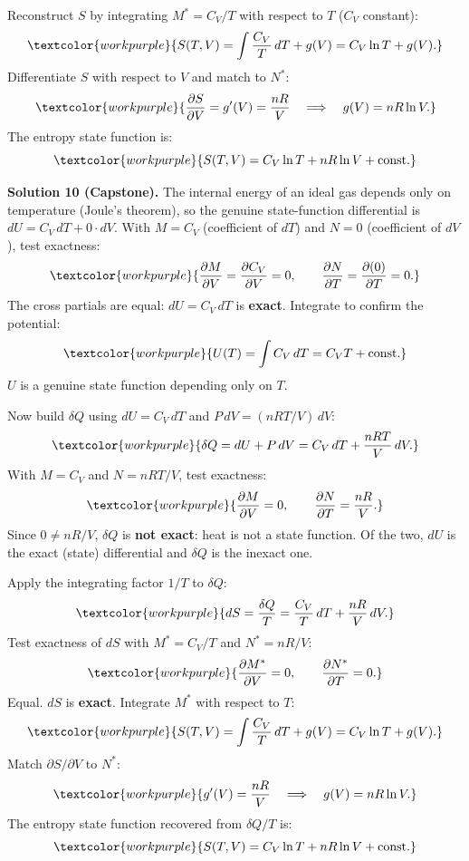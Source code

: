Reconstruct $S$ by integrating $M^* = C_V/T$ with respect to $T$
($C_V$ constant):
\[
  \textcolor{workpurple}{S(T,V)
  = \int \frac{C_V}{T}\,dT + g(V)
  = C_V\ln T + g(V).}
\]
Differentiate $S$ with respect to $V$ and match to $N^*$:
\[
  \textcolor{workpurple}{\frac{\partial S}{\partial V}
  = g'(V)
  = \frac{nR}{V}
  \quad\Longrightarrow\quad
  g(V) = nR\ln V.}
\]
The entropy state function is:
\[
  \textcolor{workpurple}{S(T,V) = C_V\ln T + nR\ln V + \text{const.}}
\]

\medskip

\noindent\textbf{Solution 10 (Capstone).}\quad
The internal energy of an ideal gas depends only on temperature (Joule's
theorem), so the genuine state-function differential is
$dU = C_V\,dT + 0\cdot dV$. With $M = C_V$ (coefficient of $dT$) and
$N = 0$ (coefficient of $dV$), test exactness:
\[
  \textcolor{workpurple}{\frac{\partial M}{\partial V}
  = \frac{\partial C_V}{\partial V}
  = 0,
  \qquad
  \frac{\partial N}{\partial T}
  = \frac{\partial (0)}{\partial T}
  = 0.}
\]
The cross partials are equal: $dU = C_V\,dT$ is \textbf{exact}. Integrate to
confirm the potential:
\[
  \textcolor{workpurple}{U(T) = \int C_V\,dT = C_V T + \text{const.}}
\]
$U$ is a genuine state function depending only on $T$.

Now build $\delta Q$ using $dU = C_V\,dT$ and $P\,dV = (nRT/V)\,dV$:
\[
  \textcolor{workpurple}{\delta Q = dU + P\,dV
  = C_V\,dT + \frac{nRT}{V}\,dV.}
\]
With $M = C_V$ and $N = nRT/V$, test exactness:
\[
  \textcolor{workpurple}{\frac{\partial M}{\partial V}
  = 0,
  \qquad
  \frac{\partial N}{\partial T}
  = \frac{nR}{V}.}
\]
Since $0 \neq nR/V$, $\delta Q$ is \textbf{not exact}: heat is not a state
function. Of the two, $dU$ is the exact (state) differential and $\delta Q$
is the inexact one.

Apply the integrating factor $1/T$ to $\delta Q$:
\[
  \textcolor{workpurple}{dS
  = \frac{\delta Q}{T}
  = \frac{C_V}{T}\,dT + \frac{nR}{V}\,dV.}
\]
Test exactness of $dS$ with $M^* = C_V/T$ and $N^* = nR/V$:
\[
  \textcolor{workpurple}{\frac{\partial M^*}{\partial V}
  = 0,
  \qquad
  \frac{\partial N^*}{\partial T}
  = 0.}
\]
Equal. $dS$ is \textbf{exact}. Integrate $M^*$ with respect to $T$:
\[
  \textcolor{workpurple}{S(T,V)
  = \int\frac{C_V}{T}\,dT + g(V)
  = C_V\ln T + g(V).}
\]
Match $\partial S/\partial V$ to $N^*$:
\[
  \textcolor{workpurple}{g'(V)
  = \frac{nR}{V}
  \quad\Longrightarrow\quad
  g(V) = nR\ln V.}
\]
The entropy state function recovered from $\delta Q/T$ is:
\[
  \textcolor{workpurple}{S(T,V)
  = C_V\ln T + nR\ln V + \text{const.}}
\]

